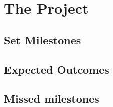 \section{The Project}
\subsection{Set Milestones}
\subsection{Expected Outcomes}
\subsection{Missed milestones}

\clearpage